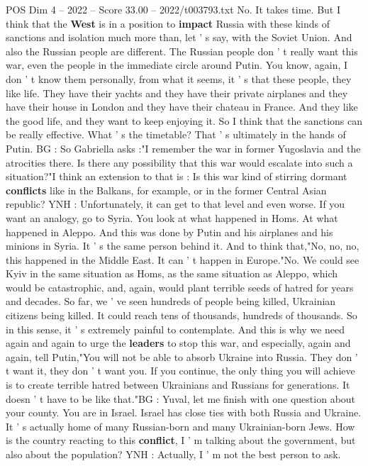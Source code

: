 \begin{textsample}{POS Dim 4 – 2022 – Score 33.00 – 2022/t003793.txt}
No.
It takes time.
But I think that the \textbf{West} is in a position to \textbf{impact} Russia with these kinds of sanctions and isolation much more than, let ' s say, with the Soviet Union.
And also the Russian people are different.
The Russian people don ' t really want this war, even the people in the immediate circle around Putin.
You know, again, I don ' t know them personally, from what it seems, it ' s that these people, they like life.
They have their yachts and they have their private airplanes and they have their house in London and they have their chateau in France.
And they like the good life, and they want to keep enjoying it.
So I think that the sanctions can be really effective.
What ' s the timetable?
That ' s ultimately in the hands of Putin.
BG : So Gabriella asks :"I remember the war in former Yugoslavia and the atrocities there.
Is there any possibility that this war would escalate into such a situation?"I think an extension to that is : Is this war kind of stirring dormant \textbf{conflicts} like in the Balkans, for example, or in the former Central Asian republic?
YNH : Unfortunately, it can get to that level and even worse.
If you want an analogy, go to Syria.
You look at what happened in Homs.
At what happened in Aleppo.
And this was done by Putin and his airplanes and his minions in Syria.
It ' s the same person behind it.
And to think that,"No, no, no, this happened in the Middle East.
It can ' t happen in Europe."No.
We could see Kyiv in the same situation as Homs, as the same situation as Aleppo, which would be catastrophic, and, again, would plant terrible seeds of hatred for years and decades.
So far, we ' ve seen hundreds of people being killed, Ukrainian citizens being killed.
It could reach tens of thousands, hundreds of thousands.
So in this sense, it ' s extremely painful to contemplate.
And this is why we need again and again to urge the \textbf{leaders} to stop this war, and especially, again and again, tell Putin,"You will not be able to absorb Ukraine into Russia.
They don ' t want it, they don ' t want you.
If you continue, the only thing you will achieve is to create terrible hatred between Ukrainians and Russians for generations.
It doesn ' t have to be like that."BG : Yuval, let me finish with one question about your county.
You are in Israel.
Israel has close ties with both Russia and Ukraine.
It ' s actually home of many Russian-born and many Ukrainian-born Jews.
How is the country reacting to this \textbf{conflict}, I ' m talking about the government, but also about the population?
YNH : Actually, I ' m not the best person to ask.

\end{textsample}
